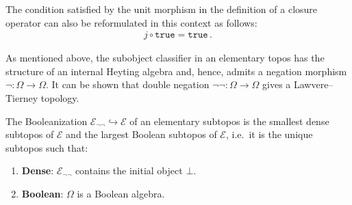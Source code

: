     \begin{remark}
        The condition satisfied by the unit morphism in the definition of a closure operator can also be reformulated in this context as follows:
        \begin{gather}
            j\circ\texttt{true} = \texttt{true}\,.
        \end{gather}
    \end{remark}

    \begin{example}\label{topos:double_negation}
        As mentioned above, the subobject classifier in an elementary topos has the structure of an internal Heyting algebra and, hence, admits a negation morphism $\lnot:\Omega\rightarrow\Omega$. It can be shown that double negation $\lnot\lnot:\Omega\rightarrow\Omega$ gives a Lawvere--Tierney topology.
    \end{example}
    \begin{property}
        The Booleanization $\mathcal{E}_{\lnot\lnot}\hookrightarrow\mathcal{E}$ of an elementary subtopos is the smallest dense subtopos of $\mathcal{E}$ and the largest Boolean subtopos of $\mathcal{E}$, i.e.~it is the unique subtopos such that:
        \begin{enumerate}
            \item\textbf{Dense}: $\mathcal{E}_{\lnot\lnot}$ contains the initial object $\bot$.
            \item\textbf{Boolean}: $\Omega$ is a Boolean algebra.
        \end{enumerate}
    \end{property}
    
